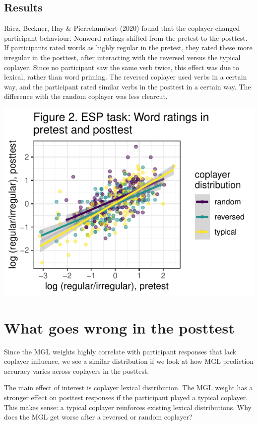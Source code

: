 \documentclass[
]{article}
\begin{document}
\hypertarget{results-1}{%
\subsection{Results}\label{results-1}}

Rácz, Beckner, Hay \& Pierrehumbert (2020) found that the coplayer
changed participant behaviour. Nonword ratings shifted from the pretest
to the posttest. If participants rated words as highly regular in the
pretest, they rated these more irregular in the posttest, after
interacting with the reversed versus the typical coplayer. Since no
participant saw the same verb twice, this effect was due to lexical,
rather than word priming. The reversed coplayer used verbs in a certain
way, and the participant rated similar verbs in the posttest in a
certain way. The difference with the random coplayer was less clearcut.

\includegraphics{figures/mainres1-1.pdf}

\hypertarget{what-goes-wrong-in-the-posttest}{%
\section{What goes wrong in the
posttest}\label{what-goes-wrong-in-the-posttest}}

Since the MGL weights highly correlate with participant responses that
lack coplayer influence, we see a similar distribution if we look at how
MGL prediction accuracy varies across coplayers in the posttest.

The main effect of interest is coplayer lexical distribution. The MGL
weight has a stronger effect on posttest responses if the participant
played a typical coplayer. This makes sense: a typical coplayer
reinforces existing lexical distributions. Why does the MGL get worse
after a reversed or random coplayer?
\end{document}

